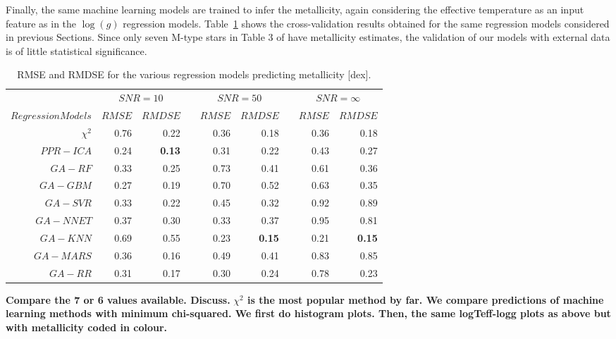 Finally, the same machine learning models are trained to infer the
metallicity, again considering the effective temperature as an input
feature as in the $\log(g)$ regression
models. Table~\ref{tab:models_M_rmse} shows the cross-validation
results obtained for the same regression models considered in previous
Sections. Since only seven M-type stars in Table 3 of \cite{cesetti}
have metallicity estimates, the validation of our models with external
data is of little statistical significance. 
%
%
\begin{table}\centering
\begin{tabular}{@{}rrrcrrcrr@{}}\toprule
& \multicolumn{2}{c}{$SNR = 10$} & \phantom{ab}& \multicolumn{2}{c}{$SNR = 50$} &
\phantom{ab} & \multicolumn{2}{c}{$SNR = \infty$}\\
\cmidrule{2-3} \cmidrule{5-6} \cmidrule{8-9}
$Regression Models$ & $RMSE$ & $RMDSE$ && $RMSE$ & $RMDSE$     && $RMSE$       & $RMDSE$ \\ \midrule
$\chi^2$    & 0.76 & 0.22      && 0.36 & 0.18     && 0.36 & 0.18 \\
$PPR-ICA$   & 0.24 & \bf{0.13} && 0.31 & 0.22     && 0.43 & 0.27 \\
$GA-RF$     & 0.33 & 0.25      && 0.73 & 0.41     && 0.61 & 0.36 \\
$GA-GBM$    & 0.27 & 0.19      && 0.70 & 0.52     && 0.63 & 0.35 \\
$GA-SVR$    & 0.33 & 0.22      && 0.45 & 0.32     && 0.92 & 0.89 \\
$GA-NNET$   & 0.37 & 0.30      && 0.33 & 0.37     && 0.95 & 0.81 \\
$GA-KNN$    & 0.69 & 0.55      && 0.23 & \bf{0.15}&& 0.21 & \bf{0.15} \\ 
$GA-MARS$   & 0.36 & 0.16      && 0.49 & 0.41     && 0.83 & 0.85 \\
$GA-RR$     & 0.31 & 0.17      && 0.30 & 0.24     && 0.78 & 0.23 \\

\bottomrule
\end{tabular}
\caption {RMSE and RMDSE for the various regression models predicting
  metallicity [dex].}
\label{tab:models_M_rmse} 
\end{table}

{\bf Compare the 7 or 6 values available. Discuss.}  {\bf $\chi^2$ is
  the most popular method by far. We compare predictions of machine
  learning methods with minimum chi-squared. We first do histogram
  plots. Then, the same logTeff-logg plots as above but with
  metallicity coded in colour.}

